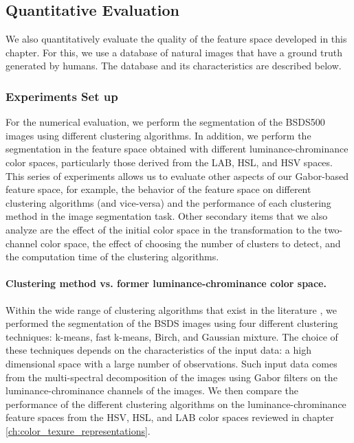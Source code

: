 \documentclass[journal]{IEEEtran}
\begin{document}
\subsection{Quantitative Evaluation}\label{subsec:quantitative_evaluation}

We also quantitatively evaluate the quality of the feature space developed in this chapter. For this, we use a database of natural images that have a ground truth generated by humans. The database and its characteristics are described below.


\subsubsection{Experiments Set up}

For the numerical evaluation, we perform the segmentation of the BSDS500 images using different clustering algorithms. In addition, we perform the segmentation in the feature space obtained with different luminance-chrominance color spaces, particularly those derived from the LAB, HSL, and HSV spaces. This series of experiments allows us to evaluate other aspects of our Gabor-based feature space, for example, the behavior of the feature space on different clustering algorithms (and vice-versa) and the performance of each clustering method in the image segmentation task. Other secondary items that we also analyze are the effect of the initial color space in the transformation to the two-channel color space, the effect of choosing the number of clusters to detect, and the computation time of the clustering algorithms. 

\paragraph{Clustering method vs. former luminance-chrominance color space.} 

Within the wide range of clustering algorithms that exist in the literature \cite{Omran.Engelbrecht.ea:IOS:2007} \cite{Sathya.Manavalan:IJCA:2011}, we performed the segmentation of the BSDS images using four different clustering techniques: k-means, fast k-means, Birch, and Gaussian mixture. The choice of these techniques depends on the characteristics of the input data: a high dimensional space with a large number of observations. Such input data comes from the multi-spectral decomposition of the images using Gabor filters on the luminance-chrominance channels of the images. We then compare the performance of the different clustering algorithms on the luminance-chrominance feature spaces from the HSV, HSL, and LAB color spaces reviewed in chapter \ref{ch:color_texure_representations}. 
\end{document}
